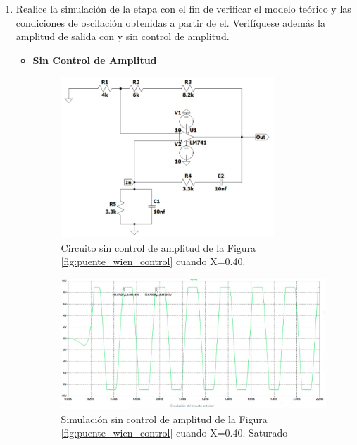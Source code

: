 \begin{enumerate}
        \item Realice la simulación de la etapa con el fin de verificar el modelo teórico y las condiciones de oscilación obtenidas a partir de el. Verifíquese además la amplitud de salida con y sin control de amplitud.

            \begin{itemize}
                \item \textbf{Sin Control de Amplitud}

                      \begin{figure}[H]
                        \centering
                        \includegraphics[width=8cm]{Imagenes/sim_cir_puente_wien_sc6.png}
                        \caption{Circuito sin control de amplitud de la Figura \ref{fig:puente_wien_control} cuando X=0.40.}
                        \label{fig:sim_cir_puente_wien_sc6}
                    \end{figure}

                    \begin{figure}[H]
                        \centering
                        \renewcommand{\figurename}{Gráfica}
                        \setcounter{figure}{0}
                        \includegraphics[width=15cm]{Imagenes/sim_puente_wien_sc6.png}
                        \caption{Simulación sin control de amplitud de la Figura \ref{fig:puente_wien_control} cuando X=0.40. Saturado}
                        \label{fig:sim_puente_wien_sc6}
                    \end{figure}


\end{itemize}
\end{enumerate}
